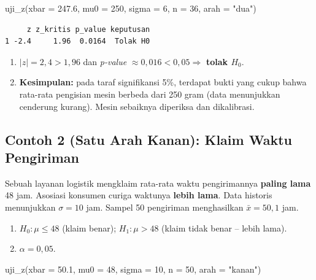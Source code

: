 \documentclass[
  indonesian,
  letterpaper,
]{book}
\newenvironment{Shaded}{\begin{snugshade}}{\end{snugshade}}
\newcommand{\AttributeTok}[1]{\textcolor[rgb]{0.40,0.45,0.13}{#1}}
\newcommand{\DecValTok}[1]{\textcolor[rgb]{0.68,0.00,0.00}{#1}}
\newcommand{\FloatTok}[1]{\textcolor[rgb]{0.68,0.00,0.00}{#1}}
\newcommand{\FunctionTok}[1]{\textcolor[rgb]{0.28,0.35,0.67}{#1}}
\newcommand{\NormalTok}[1]{\textcolor[rgb]{0.00,0.23,0.31}{#1}}
\newcommand{\StringTok}[1]{\textcolor[rgb]{0.13,0.47,0.30}{#1}}
\providecommand{\tightlist}{%
  \setlength{\itemsep}{0pt}\setlength{\parskip}{0pt}}
\begin{document}
\begin{Shaded}
\begin{Highlighting}[]
\FunctionTok{uji\_z}\NormalTok{(}\AttributeTok{xbar =} \FloatTok{247.6}\NormalTok{, }\AttributeTok{mu0 =} \DecValTok{250}\NormalTok{, }\AttributeTok{sigma =} \DecValTok{6}\NormalTok{, }\AttributeTok{n =} \DecValTok{36}\NormalTok{, }\AttributeTok{arah =} \StringTok{"dua"}\NormalTok{)}
\end{Highlighting}
\end{Shaded}

\begin{verbatim}
     z z_kritis p_value keputusan
1 -2.4     1.96  0.0164  Tolak H0
\end{verbatim}

\begin{enumerate}
\def\labelenumi{\arabic{enumi}.}
\setcounter{enumi}{3}
\tightlist
\item
  \(\lvert z \rvert = 2{,}4 > 1{,}96\) dan \emph{p-value}
  \(\approx 0{,}016 < 0{,}05 \Rightarrow\) \textbf{tolak \(H_0\)}.
\item
  \textbf{Kesimpulan:} pada taraf signifikansi 5\%, terdapat bukti yang
  cukup bahwa rata-rata pengisian mesin berbeda dari 250 gram (data
  menunjukkan cenderung kurang). Mesin sebaiknya diperiksa dan
  dikalibrasi.
\end{enumerate}

\subsection{Contoh 2 (Satu Arah Kanan): Klaim Waktu
Pengiriman}\label{contoh-2-satu-arah-kanan-klaim-waktu-pengiriman}

Sebuah layanan logistik mengklaim rata-rata waktu pengirimannya
\textbf{paling lama} 48 jam. Asosiasi konsumen curiga waktunya
\textbf{lebih lama}. Data historis menunjukkan \(\sigma = 10\) jam.
Sampel 50 pengiriman menghasilkan \(\bar{x} = 50{,}1\) jam.

\begin{enumerate}
\def\labelenumi{\arabic{enumi}.}
\tightlist
\item
  \(H_0: \mu \leq 48\) (klaim benar); \(H_1: \mu > 48\) (klaim tidak
  benar -- lebih lama).
\item
  \(\alpha = 0{,}05\).
\end{enumerate}

\begin{Shaded}
\begin{Highlighting}[]
\FunctionTok{uji\_z}\NormalTok{(}\AttributeTok{xbar =} \FloatTok{50.1}\NormalTok{, }\AttributeTok{mu0 =} \DecValTok{48}\NormalTok{, }\AttributeTok{sigma =} \DecValTok{10}\NormalTok{, }\AttributeTok{n =} \DecValTok{50}\NormalTok{, }\AttributeTok{arah =} \StringTok{"kanan"}\NormalTok{)}
\end{Highlighting}
\end{Shaded}
\end{document}
